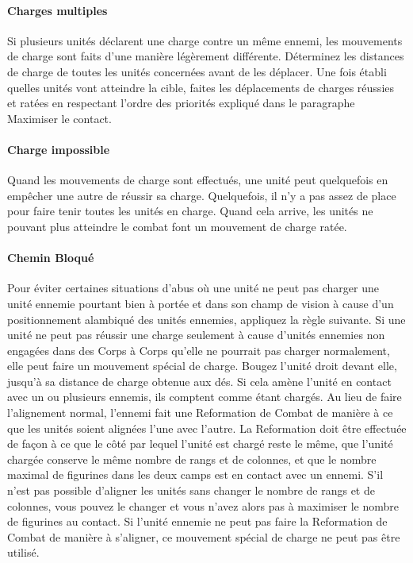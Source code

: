 \paragraph{Charges multiples}

Si plusieurs unités déclarent une charge contre un même ennemi, les mouvements de charge sont faits d'une manière légèrement différente. Déterminez les distances de charge de toutes les unités concernées avant de les déplacer. Une fois établi quelles unités vont atteindre la cible, faites les déplacements de charges réussies et ratées en respectant l'ordre des priorités expliqué dans le paragraphe Maximiser le contact.

\paragraph{Charge impossible}

Quand les mouvements de charge sont effectués, une unité peut quelquefois en empêcher une autre de réussir sa charge. Quelquefois, il n'y a pas assez de place pour faire tenir toutes les unités en charge. Quand cela arrive, les unités ne pouvant plus atteindre le combat font un mouvement de charge ratée.

\newpage
\paragraph{Chemin Bloqué}
\label{blocked_path}

Pour éviter certaines situations d'abus où une unité ne peut pas charger une unité ennemie pourtant bien à portée et dans son champ de vision à cause d'un positionnement alambiqué des unités ennemies, appliquez la règle suivante. Si une unité ne peut pas réussir une charge seulement à cause d'unités ennemies non engagées dans des Corps à Corps qu'elle ne pourrait pas charger normalement, elle peut faire un mouvement spécial de charge. Bougez l'unité droit devant elle, jusqu'à sa distance de charge obtenue aux dés. Si cela amène l'unité en contact avec un ou plusieurs ennemis, ils comptent comme étant chargés. Au lieu de faire l'alignement normal, l'ennemi fait une Reformation de Combat de manière à ce que les unités soient alignées l'une avec l'autre. La Reformation doit être effectuée de façon à ce que le côté par lequel l'unité est chargé reste le même, que l'unité chargée conserve le même nombre de rangs et de colonnes, et que le nombre maximal de figurines dans les deux camps est en contact avec un ennemi. S'il n'est pas possible d'aligner les unités sans changer le nombre de rangs et de colonnes, vous pouvez le changer et vous n'avez alors pas à maximiser le nombre de figurines au contact. Si l'unité ennemie ne peut pas faire la Reformation de Combat de manière à s'aligner, ce mouvement spécial de charge ne peut pas être utilisé.

